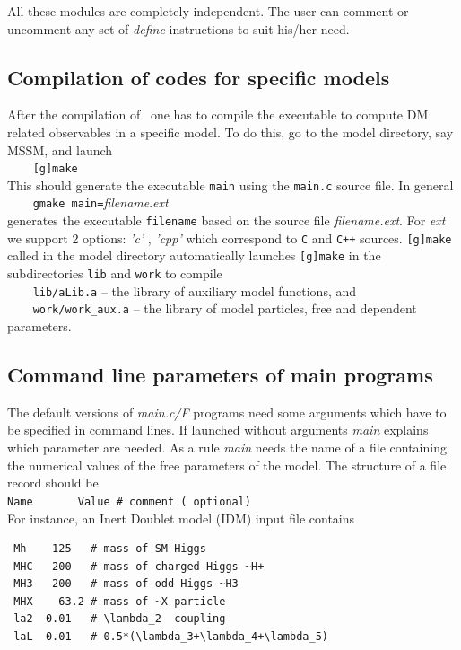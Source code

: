\documentclass[12pt,a4paper]{article}
\begin{document}
All these modules are completely independent. The user can comment or
uncomment any set of {\it define} instructions to suit his/her need. 



\subsection{Compilation of codes for specific models}
 After the compilation of \micro\ one has to compile
the executable to compute DM related observables in a specific model. To
do this, go to the model directory, say MSSM,  and launch\\[2mm]
\verb|    [g]make|\\[2mm]
This should generate the executable {\tt main} using the {\tt main.c} source file. In
general\\[2mm]
\verb|    gmake main=|{\it filename}.{\it ext}\\[2mm]
generates the executable {\tt filename}  based on the source file {\it
filename.ext}.
For {\it ext}  we support 2 options: {\it 'c'} ,  {\it 'cpp'} which correspond to
{\tt C}  and {\tt C++} sources.
{\tt [g]make} called  in the model directory automatically  launches {\tt [g]make}
in the subdirectories {\tt lib} and {\tt work} to compile \\[2mm]
 \verb|    lib/aLib.a|   -- the library of auxiliary model functions, and \\
 \verb|    work/work_aux.a| -- the library of model particles, free and dependent parameters.\\
 

\subsection{Command line parameters of main programs}
\label{sec:command}
The default versions of {\it main.c/F}  programs need some arguments
which have to be specified in command lines. If launched without
arguments {\it main} explains which parameter are needed. 
As a rule  {\it main}  needs  the name of a file containing the
numerical values of the free parameters of the model. The structure of a file
record should be\\
\verb|Name       Value # comment ( optional)|\\

\noindent
For instance, an Inert Doublet model (IDM) input file contains
\begin{verbatim}
 Mh    125   # mass of SM Higgs 
 MHC   200   # mass of charged Higgs ~H+
 MH3   200   # mass of odd Higgs ~H3
 MHX    63.2 # mass of ~X particle
 la2  0.01   # \lambda_2  coupling
 laL  0.01   # 0.5*(\lambda_3+\lambda_4+\lambda_5)
\end{verbatim}
\end{document}
